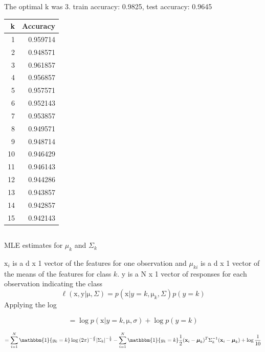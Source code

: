 \documentclass[12pt,letterpaper]{article} %
\newcommand{\bs}[1]{\bm{\mathrm{#1}}} %
\newcommand{\switch}[0]{\mathbbm{1}\{y_k=k\}}
\begin{document}
 \subsubsection{}
 
 The optimal k was 3. train accuracy: 0.9825, test accuracy: 0.9645
 
 \begin{tabular}{rr}
\toprule
  k &  Accuracy \\
\midrule
  1 &  0.959714\\
  2 &   0.948571\\
  3 &  0.961857\\
  4 &  0.956857\\
  5 &  0.957571 \\
  6 &  0.952143 \\
  7 &  0.953857 \\
  8 & 0.949571 \\
  9 &  0.948714 \\
 10 &  0.946429\\
 11 &  0.946143 \\
 12 &  0.944286\\
 13 & 0.943857 \\
 14 &  0.942857 \\
 15 & 0.942143\\
\bottomrule
\end{tabular}

 \subsection{}
 
 MLE estimates for $\mu_k$ and $\Sigma_k$
 
 $\bs{x}_i$ is a d x 1 vector of the features for one observation and $\mu_{ki}$ is a d x 1 vector of the means of the features for class $k$. y is a N x 1 vector of responses for each observation indicating the class
 \begin{equation*}
  \ell(\bs{x},\bs{y}| \bs{\mu},\Sigma) = p(\bs{x}|y=k, \bs{\mu}_k,\Sigma)p(y=k)
 \end{equation*}
Applying the log

\begin{equation*}
 = \log{p(\bs{x}|y=k, \bs{\mu},\sigma)} + \log{p(y=k)}
 \end{equation*}

 \begin{equation*} 
  = \sum^N_{i=1}\switch{}\log{(2\pi)^{-\frac{d}{2}}|\Sigma_k|^{-\frac{1}{2}}}-\sum^N_{i=1}\switch{}\frac{1}{2}(\bs{x}_i-\bs{\mu}_{k})^T\Sigma_k^{-1}(\bs{x}_i -\bs{\mu}_{k}) + \log{\frac{1}{10}}
 \end{equation*}
 
\end{document}
